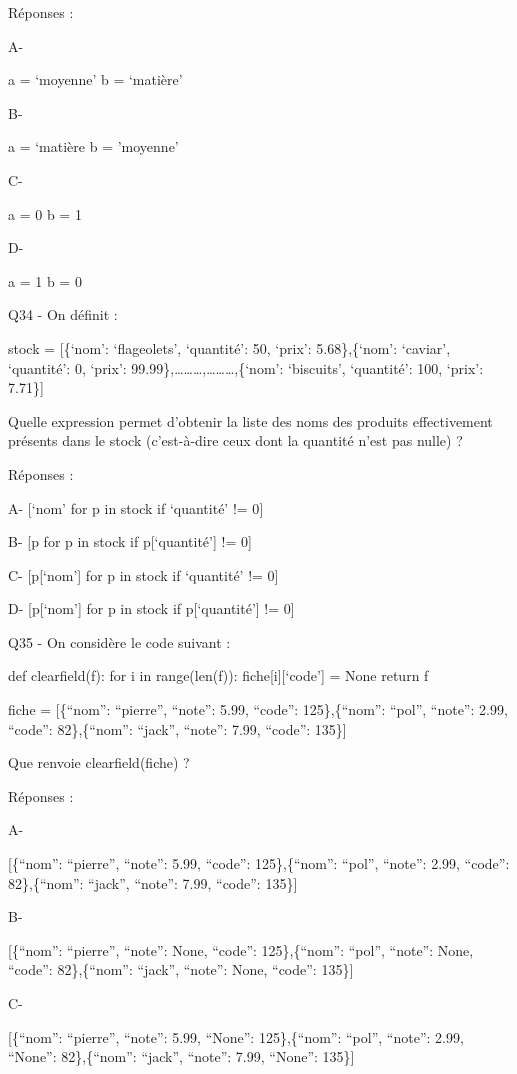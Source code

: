 \documentclass[
]{book}
\begin{document}
Réponses :

A-

a = `moyenne'
b = `matière'

B-

a = `matière
b = 'moyenne'

C-

a = 0
b = 1

D-

a = 1
b = 0

Q34 - On définit :

stock = {[}\{`nom': `flageolets', `quantité': 50, `prix': 5.68\},\{`nom': `caviar', `quantité': 0, `prix': 99.99\},\ldots\ldots\ldots,\ldots\ldots\ldots,\{`nom': `biscuits', `quantité': 100, `prix': 7.71\}{]}

Quelle expression permet d'obtenir la liste des noms des produits effectivement présents dans le stock (c'est-à-dire ceux dont la quantité n'est pas nulle) ?

Réponses :

A- {[}`nom' for p in stock if `quantité' != 0{]}

B- {[}p for p in stock if p{[}`quantité'{]} != 0{]}

C- {[}p{[}`nom'{]} for p in stock if `quantité' != 0{]}

D- {[}p{[}`nom'{]} for p in stock if p{[}`quantité'{]} != 0{]}

Q35 - On considère le code suivant :

def clearfield(f):
for i in range(len(f)):
fiche{[}i{]}{[}`code'{]} = None
return f

fiche = {[}\{``nom'': ``pierre'', ``note'': 5.99, ``code'': 125\},\{``nom'': ``pol'', ``note'': 2.99, ``code'': 82\},\{``nom'': ``jack'', ``note'': 7.99, ``code'': 135\}{]}

Que renvoie clearfield(fiche) ?

Réponses :

A-

{[}\{``nom'': ``pierre'', ``note'': 5.99, ``code'': 125\},\{``nom'': ``pol'', ``note'': 2.99, ``code'': 82\},\{``nom'': ``jack'', ``note'': 7.99, ``code'': 135\}{]}

B-

{[}\{``nom'': ``pierre'', ``note'': None, ``code'': 125\},\{``nom'': ``pol'', ``note'': None, ``code'': 82\},\{``nom'': ``jack'', ``note'': None, ``code'': 135\}{]}

C-

{[}\{``nom'': ``pierre'', ``note'': 5.99, ``None'': 125\},\{``nom'': ``pol'', ``note'': 2.99, ``None'': 82\},\{``nom'': ``jack'', ``note'': 7.99, ``None'': 135\}{]}
\end{document}
